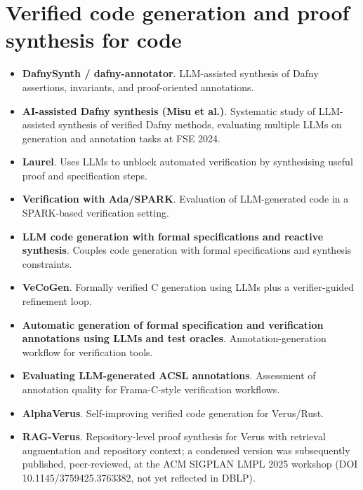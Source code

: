 \documentclass[natbib=false,acmsmall,nonacm,11pt]{acmart}
\begin{document}
\section{Verified code generation and proof synthesis for code}\label{sec:verified-code}
\begin{itemize}
\item \textbf{DafnySynth / dafny-annotator}. LLM-assisted synthesis of Dafny assertions, invariants, and proof-oriented annotations.~\cite{DBLP:journals/corr/abs-2411-15143}
\item \textbf{AI-assisted Dafny synthesis (Misu et al.)}. Systematic study of LLM-assisted synthesis of verified Dafny methods, evaluating multiple LLMs on generation and annotation tasks at FSE 2024.~\cite{DBLP:journals/pacmse/MisuLM024}
\item \textbf{Laurel}. Uses LLMs to unblock automated verification by synthesising useful proof and specification steps.~\cite{DBLP:journals/pacmpl/MugnierGPJY25}
\item \textbf{Verification with Ada/SPARK}. Evaluation of LLM-generated code in a SPARK-based verification setting.~\cite{DBLP:conf/icsoft/CramerM25}
\item \textbf{LLM code generation with formal specifications and reactive synthesis}. Couples code generation with formal specifications and synthesis constraints.~\cite{DBLP:journals/corr/abs-2410-19736}
\item \textbf{VeCoGen}. Formally verified C generation using LLMs plus a verifier-guided refinement loop.~\cite{DBLP:conf/icse-formalise/SevenhuijsenEN25}
\item \textbf{Automatic generation of formal specification and verification annotations using LLMs and test oracles}. Annotation-generation workflow for verification tools.~\cite{DBLP:journals/corr/abs-2601-12845}
\item \textbf{Evaluating LLM-generated ACSL annotations}. Assessment of annotation quality for Frama-C-style verification workflows.~\cite{DBLP:journals/corr/abs-2602-13851}
\item \textbf{AlphaVerus}. Self-improving verified code generation for Verus/Rust.~\cite{alphaverus_project}
\item \textbf{RAG-Verus}. Repository-level proof synthesis for Verus with retrieval augmentation and repository context; a condensed version was subsequently published, peer-reviewed, at the ACM SIGPLAN LMPL 2025 workshop (DOI 10.1145/3759425.3763382, not yet reflected in DBLP).~\cite{DBLP:journals/corr/abs-2502-05344}

\end{itemize}
\end{document}
